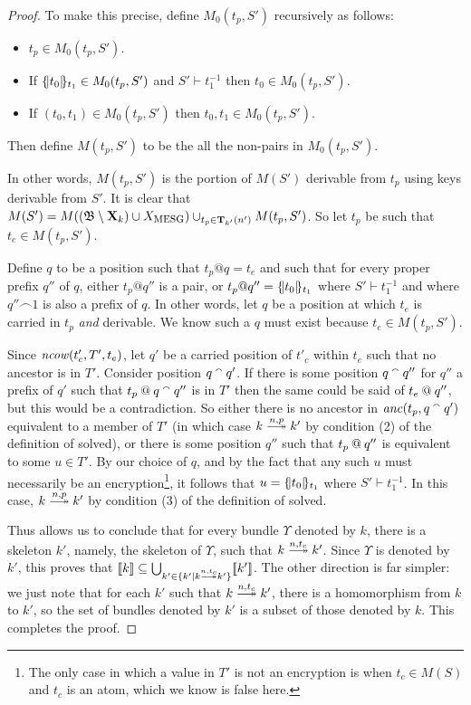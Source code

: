\documentclass[12pt]{article}
\theoremstyle{definition}
\newcommand{\scap}[1]{\ensuremath{\mathop{\relax
                    \smash{\mbox{\sc#1}}}\!\mathop{\vphantom{#1}}\nolimits}}
\newcommand{\base}{\ensuremath{\mathfrak B}}
\newcommand{\solve}[1]{\stackrel{#1}{\longtwoheadrightarrow}}
\newcommand{\excl}{\mathbf{X}}
\newcommand{\transpred}{\mathbf{T}}
\newcommand{\anc}{\fn{anc}}
\newcommand{\mncow}{\fn{ncow}}
\begin{document}
\begin{proof}
To make this precise, define $M_0(t_p,S')$ recursively as follows:

\begin{itemize}
\item $t_p \in M_0(t_p,S')$.
\item If $\{\!|t_0|\!\}_{t_1} \in M_0(t_p,S')$ and $S' \vdash t_1^{-1}$ then $t_0 \in M_0(t_p,S')$.
\item If $(t_0, t_1) \in M_0(t_p,S')$ then $t_0, t_1 \in M_0(t_p,S')$.
\end{itemize}

Then define $M(t_p,S')$ to be the all the non-pairs in $M_0(t_p,S')$.

In other words, $M(t_p,S')$ is the portion of $M(S')$ derivable from $t_p$ using keys derivable from $S'$.  It is clear that
$M(S') = M((\base\setminus\excl_k)\cup X_{\scap{mesg}}) \cup_{t_p \in \transpred_{k'}(n')} M(t_p,S')$.  So let $t_p$ be such that $t_e
\in M(t_p,S')$.

Define $q$ to be a position such that $t_p @ q = t_e$ and such that for every proper prefix $q''$ of $q$, either $t_p @ q''$
is a pair, or $t_p @ q'' = \{\!|t_0|\!\}_{t_1}$ where $S' \vdash t_1^{-1}$ and where $q'' \frown 1$ is also a prefix of $q$.
In other words, let $q$ be a position at which $t_e$ is carried in $t_p$ {\em and} derivable.  We know such a $q$ must exist
because $t_e \in M(t_p,S')$.

Since $\mncow(t'_c, T', t_e)$, let $q'$ be a carried position of $t'_c$ within $t_e$ such that no ancestor is in $T'$.  Consider
position $q \mathbin{{}^\smallfrown} q'$.  If there is some position $q \mathbin{{}^\smallfrown} q''$ for $q''$ a prefix of $q'$ such that $t_p \mathbin{@} q \mathbin{{}^\smallfrown}
q''$ is in $T'$ then the same could be said of $t_e \mathbin{@} q''$, but this would be a contradiction.  So either there is
no ancestor in $\anc(t_p, q \append q')$ equivalent to a member of $T'$ (in which case $k\solve{n,p}k'$ by condition (2)
of the definition of solved), or there is some position $q''$ such that $t_p \mathbin{@} q''$ is equivalent to some $u \in T'$.
By our choice of $q$, and by the fact that any such $u$ must necessarily be an encryption\footnote{The only case in which a
value in $T'$ is not an encryption is when $t_c \in M(S)$ and $t_c$ is an atom, which we know is false here.}, it follows that
$u = \{\!|t_0|\!\}_{t_1}$ where $S' \vdash t_1^{-1}$.  In this case, $k\solve{n,p}k'$ by condition (3) of the definition of solved.

Thus allows us to conclude that for every bundle $\Upsilon$ denoted by $k$, there is a skeleton $k'$,
namely, the skeleton of $\Upsilon$, such that $k\solve{n,t_c}k'$.  Since $\Upsilon$ is denoted by $k'$,
this proves that $\sembrack{k} \subseteq \bigcup_{k'\in\{k'\mid k\solve{n,t_c}k'\}}\sembrack{k'}$.  The other direction
is far simpler: we just note that for each $k'$ such that $k\solve{n,t_c}k'$, there is a homomorphism
from $k$ to $k'$, so the set of bundles denoted by $k'$ is a subset of those denoted by $k$.  This completes the proof.

\end{proof}
\end{document}
